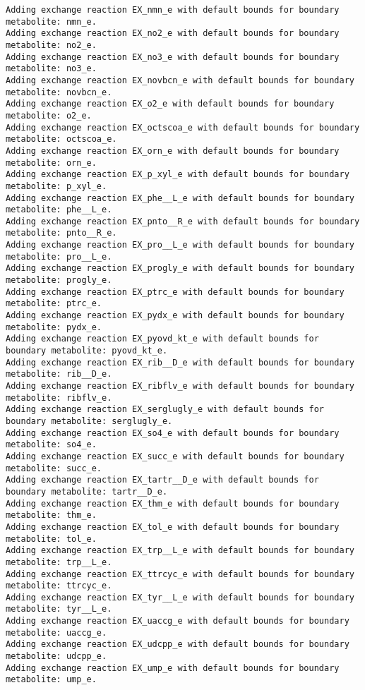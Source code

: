 \documentclass[
  letterpaper,
  DIV=11,
  numbers=noendperiod]{scrartcl}
\begin{document}
\begin{verbatim}
Adding exchange reaction EX_nmn_e with default bounds for boundary metabolite: nmn_e.
Adding exchange reaction EX_no2_e with default bounds for boundary metabolite: no2_e.
Adding exchange reaction EX_no3_e with default bounds for boundary metabolite: no3_e.
Adding exchange reaction EX_novbcn_e with default bounds for boundary metabolite: novbcn_e.
Adding exchange reaction EX_o2_e with default bounds for boundary metabolite: o2_e.
Adding exchange reaction EX_octscoa_e with default bounds for boundary metabolite: octscoa_e.
Adding exchange reaction EX_orn_e with default bounds for boundary metabolite: orn_e.
Adding exchange reaction EX_p_xyl_e with default bounds for boundary metabolite: p_xyl_e.
Adding exchange reaction EX_phe__L_e with default bounds for boundary metabolite: phe__L_e.
Adding exchange reaction EX_pnto__R_e with default bounds for boundary metabolite: pnto__R_e.
Adding exchange reaction EX_pro__L_e with default bounds for boundary metabolite: pro__L_e.
Adding exchange reaction EX_progly_e with default bounds for boundary metabolite: progly_e.
Adding exchange reaction EX_ptrc_e with default bounds for boundary metabolite: ptrc_e.
Adding exchange reaction EX_pydx_e with default bounds for boundary metabolite: pydx_e.
Adding exchange reaction EX_pyovd_kt_e with default bounds for boundary metabolite: pyovd_kt_e.
Adding exchange reaction EX_rib__D_e with default bounds for boundary metabolite: rib__D_e.
Adding exchange reaction EX_ribflv_e with default bounds for boundary metabolite: ribflv_e.
Adding exchange reaction EX_serglugly_e with default bounds for boundary metabolite: serglugly_e.
Adding exchange reaction EX_so4_e with default bounds for boundary metabolite: so4_e.
Adding exchange reaction EX_succ_e with default bounds for boundary metabolite: succ_e.
Adding exchange reaction EX_tartr__D_e with default bounds for boundary metabolite: tartr__D_e.
Adding exchange reaction EX_thm_e with default bounds for boundary metabolite: thm_e.
Adding exchange reaction EX_tol_e with default bounds for boundary metabolite: tol_e.
Adding exchange reaction EX_trp__L_e with default bounds for boundary metabolite: trp__L_e.
Adding exchange reaction EX_ttrcyc_e with default bounds for boundary metabolite: ttrcyc_e.
Adding exchange reaction EX_tyr__L_e with default bounds for boundary metabolite: tyr__L_e.
Adding exchange reaction EX_uaccg_e with default bounds for boundary metabolite: uaccg_e.
Adding exchange reaction EX_udcpp_e with default bounds for boundary metabolite: udcpp_e.
Adding exchange reaction EX_ump_e with default bounds for boundary metabolite: ump_e.

\end{verbatim}
\end{document}
